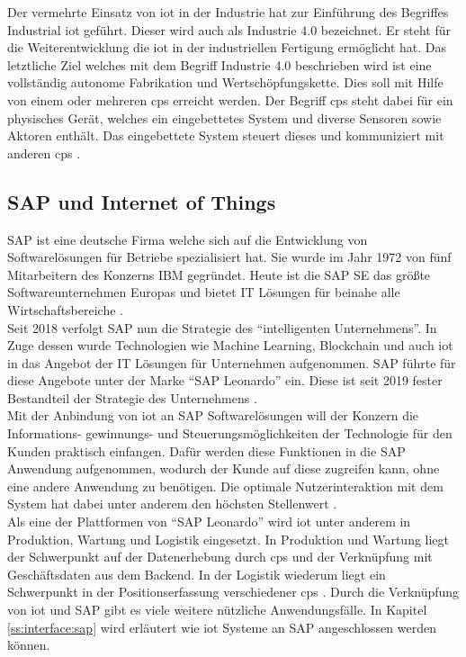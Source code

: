 \noindent Der vermehrte Einsatz von \ac{iot} in der Industrie hat zur Einführung des Begriffes Industrial \ac{iot} geführt. Dieser wird auch als Industrie 4.0 bezeichnet. Er steht für die Weiterentwicklung die \ac{iot} in der industriellen Fertigung ermöglicht hat. Das letztliche Ziel welches mit dem Begriff Industrie 4.0 beschrieben wird ist eine vollständig autonome Fabrikation und Wertschöpfungskette. Dies soll mit Hilfe von einem oder mehreren \ac{cps} erreicht werden. Der Begriff \ac{cps} steht dabei für ein physisches Gerät, welches ein eingebettetes System und diverse Sensoren sowie Aktoren enthält. Das eingebettete System steuert dieses und kommuniziert mit anderen \ac{cps} \cite[Seite 30f]{Schell17:INS}.\\

\subsection{SAP und Internet of Things}
\label{ss:grundlagen:sap}

\noindent SAP ist eine deutsche Firma welche sich auf die Entwicklung von Softwarelösungen für Betriebe spezialisiert hat. Sie wurde im Jahr 1972 von fünf Mitarbeitern des Konzerns IBM gegründet. Heute ist die SAP SE das größte Softwareunternehmen Europas und bietet IT Lösungen für beinahe alle Wirtschaftsbereiche \cite{SAP:WWW}.\\

\noindent Seit 2018 verfolgt SAP nun die Strategie des "`intelligenten Unternehmens"'. In Zuge dessen wurde Technologien wie Machine Learning, Blockchain und auch \ac{iot} in das Angebot der IT Lösungen für Unternehmen aufgenommen. SAP führte für diese Angebote unter der Marke "`SAP Leonardo"' ein. Diese ist seit 2019 fester Bestandteil der Strategie des Unternehmens \cite[Seite 102f]{Holtschulte20:IOS}.\\ 

\noindent Mit der Anbindung von \ac{iot} an SAP Softwarelösungen will der Konzern die Informations- gewinnungs- und Steuerungsmöglichkeiten der Technologie für den Kunden praktisch einfangen. Dafür werden diese Funktionen in die SAP Anwendung aufgenommen, wodurch der Kunde auf diese zugreifen kann, ohne eine andere Anwendung zu benötigen. Die optimale Nutzerinteraktion mit dem System hat dabei unter anderem den höchsten Stellenwert \cite[Seite 105f]{Holtschulte20:IOS}.\\

\noindent Als eine der Plattformen von "`SAP Leonardo"' wird \ac{iot} unter anderem in Produktion, Wartung und Logistik eingesetzt. In Produktion und Wartung liegt der Schwerpunkt auf der Datenerhebung durch \ac{cps} und der Verknüpfung mit Geschäftsdaten aus dem Backend. In der Logistik wiederum liegt ein Schwerpunkt in der Positionserfassung verschiedener \ac{cps} \cite[Seite 107ff]{Holtschulte20:IOS}. Durch die Verknüpfung von \ac{iot} und SAP gibt es viele weitere nützliche Anwendungsfälle. In Kapitel \ref{ss:interface:sap} wird erläutert wie \ac{iot} Systeme an SAP angeschlossen werden können.\\


